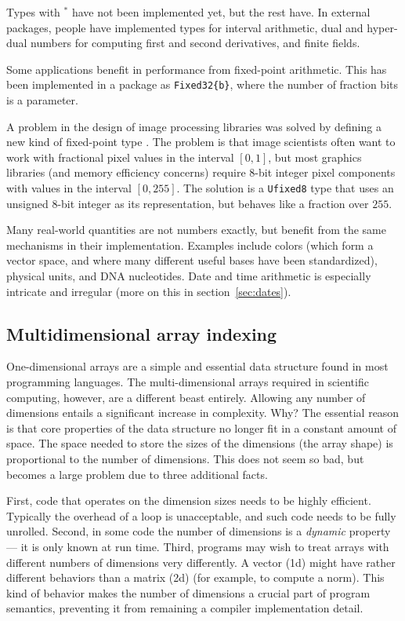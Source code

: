 \noindent
Types with $^*$ have not been implemented yet, but the rest have.
In external packages, people have implemented types for interval arithmetic,
dual and hyper-dual numbers for computing first and second derivatives,
and finite fields.

Some applications benefit in performance from fixed-point arithmetic.
This has been implemented in a package as \texttt{Fixed32\{b\}}, where
the number of fraction bits is a parameter.

A problem in the design of image processing libraries was solved by
defining a new kind of fixed-point type \cite{ufixed}. The problem
is that image scientists often want to work with fractional pixel values in the
interval $[0,1]$, but most graphics libraries (and memory
efficiency concerns) require 8-bit integer pixel components with
values in the interval $[0,255]$. The solution is a \texttt{Ufixed8}
type that uses an unsigned 8-bit integer as its representation, but
behaves like a fraction over $255$.

Many real-world quantities are not numbers exactly, but benefit from the
same mechanisms in their implementation. Examples include colors (which form
a vector space, and where many different useful bases have been standardized),
physical units, and DNA nucleotides. Date and time arithmetic is especially
intricate and irregular (more on this in section~\ref{sec:dates}).


\subsection{Multidimensional array indexing}
\label{sec:ndindexing}

One-dimensional arrays are a simple and essential data structure found in
most programming languages. The multi-dimensional arrays required in
scientific computing, however, are a different beast entirely. Allowing
any number of dimensions entails a significant increase in complexity. Why?
The essential reason is that core properties of the data structure no
longer fit in a constant amount of space. The space needed to store the
sizes of the dimensions (the array shape) is proportional to the number
of dimensions. This does not seem so bad, but becomes a large problem
due to three additional facts.

First, code that operates on the dimension
sizes needs to be highly efficient. Typically the overhead of a loop is
unacceptable, and such code needs to be fully unrolled. Second, in some
code the number of dimensions is a \emph{dynamic} property --- it is
only known at run time. Third, programs may wish to treat arrays with
different numbers of dimensions very differently. A vector (1d) might
have rather different behaviors than a matrix (2d) (for example, to
compute a norm). This kind of
behavior makes the number of dimensions a crucial part of program
semantics, preventing it from remaining a compiler implementation detail.

